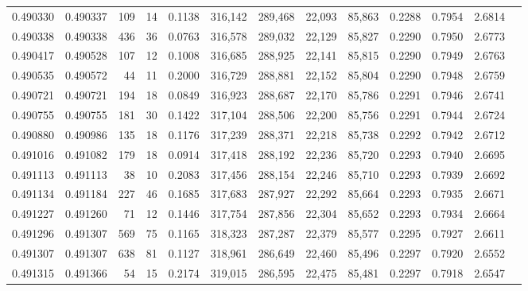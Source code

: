 \begin{tabular}{rrrrrrrrrrrrr}
0.490330 & 0.490337 &   109 &    14 &                                     0.1138 & 316,142 & 289,468 &  22,093 &  85,863 & 0.2288 & 0.7954 & 2.6814 \\
0.490338 & 0.490338 &   436 &    36 &                                     0.0763 & 316,578 & 289,032 &  22,129 &  85,827 & 0.2290 & 0.7950 & 2.6773 \\
0.490417 & 0.490528 &   107 &    12 &                                     0.1008 & 316,685 & 288,925 &  22,141 &  85,815 & 0.2290 & 0.7949 & 2.6763 \\
0.490535 & 0.490572 &    44 &    11 &                                     0.2000 & 316,729 & 288,881 &  22,152 &  85,804 & 0.2290 & 0.7948 & 2.6759 \\
0.490721 & 0.490721 &   194 &    18 &                                     0.0849 & 316,923 & 288,687 &  22,170 &  85,786 & 0.2291 & 0.7946 & 2.6741 \\
0.490755 & 0.490755 &   181 &    30 &                                     0.1422 & 317,104 & 288,506 &  22,200 &  85,756 & 0.2291 & 0.7944 & 2.6724 \\
0.490880 & 0.490986 &   135 &    18 &                                     0.1176 & 317,239 & 288,371 &  22,218 &  85,738 & 0.2292 & 0.7942 & 2.6712 \\
0.491016 & 0.491082 &   179 &    18 &                                     0.0914 & 317,418 & 288,192 &  22,236 &  85,720 & 0.2293 & 0.7940 & 2.6695 \\
0.491113 & 0.491113 &    38 &    10 &                                     0.2083 & 317,456 & 288,154 &  22,246 &  85,710 & 0.2293 & 0.7939 & 2.6692 \\
0.491134 & 0.491184 &   227 &    46 &                                     0.1685 & 317,683 & 287,927 &  22,292 &  85,664 & 0.2293 & 0.7935 & 2.6671 \\
0.491227 & 0.491260 &    71 &    12 &                                     0.1446 & 317,754 & 287,856 &  22,304 &  85,652 & 0.2293 & 0.7934 & 2.6664 \\
0.491296 & 0.491307 &   569 &    75 &                                     0.1165 & 318,323 & 287,287 &  22,379 &  85,577 & 0.2295 & 0.7927 & 2.6611 \\
0.491307 & 0.491307 &   638 &    81 &                                     0.1127 & 318,961 & 286,649 &  22,460 &  85,496 & 0.2297 & 0.7920 & 2.6552 \\
0.491315 & 0.491366 &    54 &    15 &                                     0.2174 & 319,015 & 286,595 &  22,475 &  85,481 & 0.2297 & 0.7918 & 2.6547 \\

\end{tabular}
